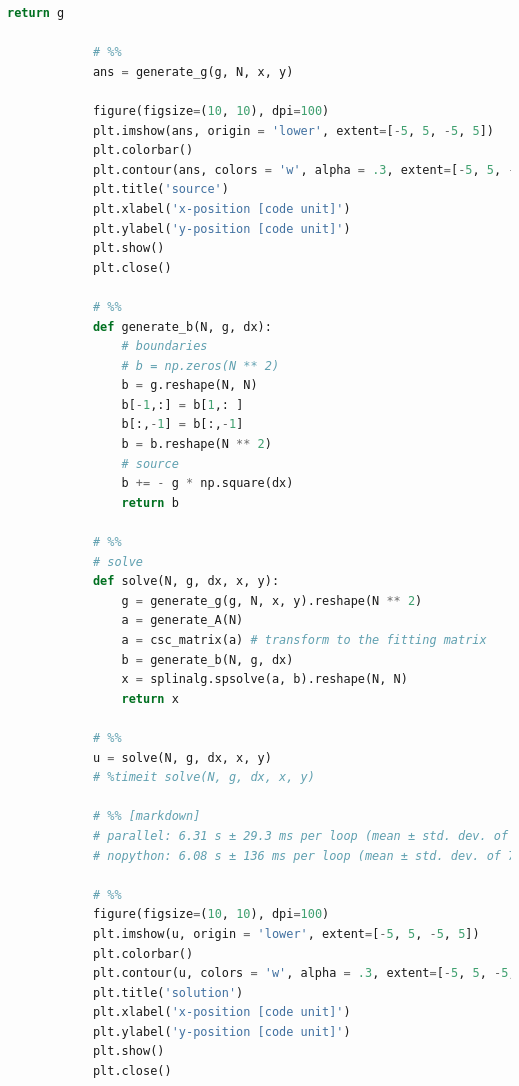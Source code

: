 \documentclass[12pt]{article}
\begin{document}
\begin{lstlisting}[language={Python}]
                return g
            
            # %%
            ans = generate_g(g, N, x, y)
            
            figure(figsize=(10, 10), dpi=100)
            plt.imshow(ans, origin = 'lower', extent=[-5, 5, -5, 5])
            plt.colorbar()
            plt.contour(ans, colors = 'w', alpha = .3, extent=[-5, 5, -5, 5])
            plt.title('source')
            plt.xlabel('x-position [code unit]')
            plt.ylabel('y-position [code unit]')
            plt.show()
            plt.close()
            
            # %%
            def generate_b(N, g, dx):
                # boundaries
                # b = np.zeros(N ** 2)
                b = g.reshape(N, N)
                b[-1,:] = b[1,: ]
                b[:,-1] = b[:,-1]
                b = b.reshape(N ** 2)
                # source
                b += - g * np.square(dx)
                return b
            
            # %%
            # solve
            def solve(N, g, dx, x, y):
                g = generate_g(g, N, x, y).reshape(N ** 2)
                a = generate_A(N)
                a = csc_matrix(a) # transform to the fitting matrix
                b = generate_b(N, g, dx)
                x = splinalg.spsolve(a, b).reshape(N, N)
                return x
            
            # %%
            u = solve(N, g, dx, x, y)
            # %timeit solve(N, g, dx, x, y)
            
            # %% [markdown]
            # parallel: 6.31 s ± 29.3 ms per loop (mean ± std. dev. of 7 runs, 1 loop each)  
            # nopython: 6.08 s ± 136 ms per loop (mean ± std. dev. of 7 runs, 1 loop each)
            
            # %%
            figure(figsize=(10, 10), dpi=100)
            plt.imshow(u, origin = 'lower', extent=[-5, 5, -5, 5])
            plt.colorbar()
            plt.contour(u, colors = 'w', alpha = .3, extent=[-5, 5, -5, 5])
            plt.title('solution')
            plt.xlabel('x-position [code unit]')
            plt.ylabel('y-position [code unit]')
            plt.show()
            plt.close()            
        \end{lstlisting}
\end{document}
